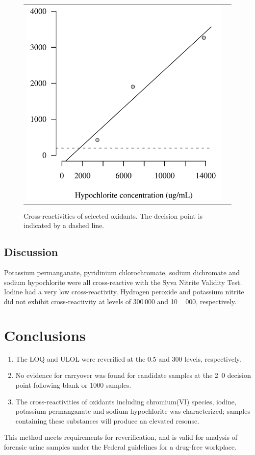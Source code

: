\documentclass[article,11pt,oneside]{memoir}
\begin{document}
\begin{figure}[p!]
\begin{tabular}{rr}
\includegraphics[scale=0.63]{hypochlorite} & \tabularnewline
\end{tabular}
\caption{Cross-reactivities of selected oxidants. The decision point
  is indicated by a dashed line.}
\label{oxidants}
\end{figure}

\section{Discussion}
Potassium permanganate, pyridinium chlorochromate, sodium dichromate
and sodium hypochlorite were all cross-reactive with the Syva Nitrite
Validity Test.
Iodine had a very low cross-reactivity.
Hydrogen peroxide and potassium nitrite did not exhibit
cross-reactivity at levels of 300\,000 and \unit{10\,000}{\micro\gram\per\milli\liter}, respectively.

\chapter{Conclusions}
\begin{enumerate}
\item The LOQ and ULOL were reverified at the 0.5 and \unit{300}{\milli\gram\per\deci\liter} levels, respectively.
\item No evidence for carryover was found for candidate samples at the \unit{2.0}{\milli\gram\per\deci\liter} decision point following blank or \unit{1000}{\milli\gram\per\deci\liter} samples.
\item The cross-reactivities of oxidants including chromium(VI) species, iodine,
  potassium permanganate and sodium hypochlorite was characterized;
  samples containing these substances will produce an elevated resonse.
\end{enumerate}
This method meets requirements for reverification, and is valid for analysis of forensic urine samples under the Federal guidelines for a drug-free workplace.


\end{document}
